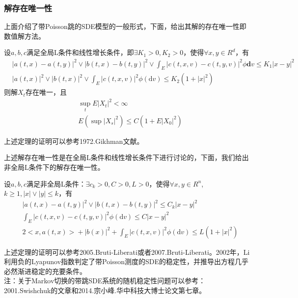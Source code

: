         \subsubsection{解存在唯一性}
            \par
            上面介绍了带Poisson跳的SDE模型的一般形式，下面，给出其解的存在唯一性即数值解方法。
            \begin{theorem}[解存在唯一性]
                设$a,b,c$满足全局L条件和线性增长条件，即$\exists K_1>0,K_2>0$，使得$\forall x,y \in R^d$，有
                \begin{align*}
                &|a(t,x) - a(t,y) |^2 \vee |b(t,x) - b(t,y) |^2 \vee \int_E |c(t,x,v) - c(t,y,v) |^2\phi \mathbf{d}v \leqslant K_1|x-y|^2\\
                &|a(t,x)|^2 \vee|b(t,x)|^2 \vee\int_E|c(t,x,v)|^2\phi(\mathrm{d}v) \leqslant K_2(1+|x|^2)
                \end{align*}
                则解$X_t$存在唯一，且
                \begin{align*}
                    &\sup\limits_t E|X_t|^2 <\infty\\
                    &E \left( \sup|X_s|^2 \right) \leqslant C(1+E|X_0|^2)
                \end{align*}
            \end{theorem}
            \par
            上述定理的证明可以参考1972.Gikhman文献\cite{1972.Gikhman}。
            \par
            上述解存在唯一性是在全局L条件和线性增长条件下进行讨论的，下面，我们给出非全局L条件下的解存在唯一性。
            \begin{theorem}[非全局L条件下解存在唯一性]
                设$a,b,c$满足非全局L条件：$\exists c_k>0,C>0,L>0$，使得$\forall x,y\in R^n$,$k \geqslant 1,|x|\vee|y| \leqslant k$，有
                \begin{align*}
                    &|a(t,x) - a(t,y) |^2 \vee |b(t,x) - b(t,y) |^2 \leqslant C_k|x-y|^2 \\
                    &\int_E|c(t,x,v) - c(t,y,v)|^2\phi(\mathrm{d}v) \leqslant C|x -y|^2\\
                    &2\bigl<x,a(t,x)\bigr>+|b(x)|^2 + \int_E|c(t,x,v)|^2\phi(\mathrm{d}v) \leqslant L(1+|x|^2)
                \end{align*}
            \end{theorem}
            上述定理的证明可以参考2005.Bruti-Liberati\cite{2005.Bruti-Liberati}或者2007.Bruti-Liberati\cite{2007.Bruti-Liberati}。2002年，Li利用负的Lyapunov指数判定了带Poisson测度的SDE的稳定性，并推导出方程几乎必然渐进稳定的充要条件。\\
            注：关于Markov切换的带跳SDE系统的随机稳定性问题可以参考：2001.Swishchuk的文章\cite{2001.Swishchuk}和2014.宗小峰.华中科技大博士论文\cite{zong.2014}第七章。
